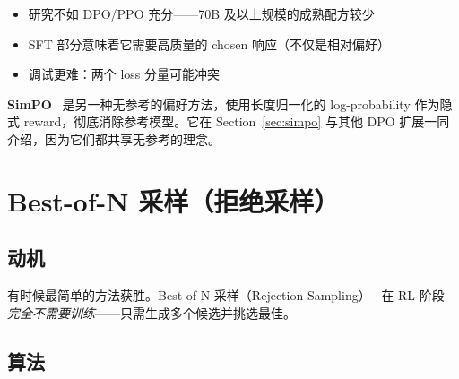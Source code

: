 \begin{warningbox}
\begin{itemize}
  \item 研究不如 DPO/PPO 充分——70B 及以上规模的成熟配方较少
  \item SFT 部分意味着它需要高质量的 chosen 响应（不仅是相对偏好）
  \item 调试更难：两个 loss 分量可能冲突
\end{itemize}
\end{warningbox}

\begin{keybox}[另见：SimPO]
\textbf{SimPO}~\cite{meng2024simpo} 是另一种无参考的偏好方法，使用长度归一化的 log-probability 作为隐式 reward，彻底消除参考模型。它在 Section~\ref{sec:simpo} 与其他 DPO 扩展一同介绍，因为它们都共享无参考的理念。
\end{keybox}

\section{Best-of-N 采样（拒绝采样）}
\label{best-of-n-sampling-rejection-sampling}

\subsection{动机}
\label{motivation-4}

有时候最简单的方法获胜。Best-of-N 采样（Rejection Sampling）~\cite{nakano2021webgpt} 在 RL 阶段 \emph{完全不需要训练}——只需生成多个候选并挑选最佳。

\subsection{算法}
\label{algorithm-1}

